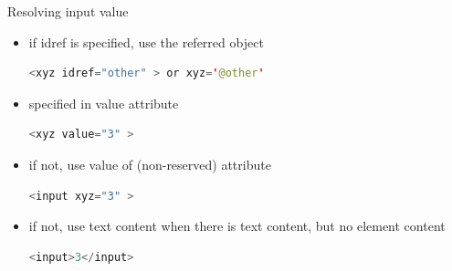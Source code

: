 \documentclass{beamer}
\theoremstyle{definition}
\begin{document}
\begin{frame}[containsverbatim]
{Resolving input value}

\begin{itemize}
\item if idref is specified, use the referred object
\begin{lstlisting}[language=java]
    <xyz idref="other" > or xyz='@other'
\end{lstlisting}
\item specified in value attribute
\begin{lstlisting}[language=java]
    <xyz value="3" >
\end{lstlisting}
\item if not, use value of (non-reserved) attribute
\begin{lstlisting}[language=java]
    <input xyz="3" >
\end{lstlisting}
\item if not, use text content when there is text content, but no element content
\begin{lstlisting}[language=java]
    <input>3</input>
\end{lstlisting}
\end{itemize}
\end{frame}
\end{document}
